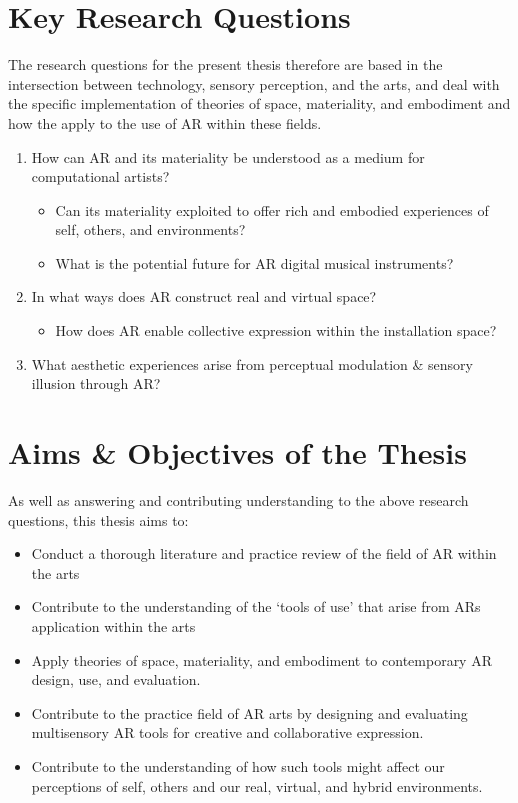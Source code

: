 \section{Key Research Questions}
The research questions for the present thesis therefore are based in the intersection between technology, sensory perception, and the arts, and deal with the specific implementation of theories of space, materiality, and embodiment and how the apply to the use of AR within these fields.

\begin{enumerate}
    \item How can AR and its materiality be understood as a medium for computational artists?
    \begin{itemize}
        \item Can its materiality exploited to offer rich and embodied experiences of self, others, and environments?
        \item What is the potential future for AR digital musical instruments?
    \end{itemize}
    \item In what ways does AR construct real and virtual space?
    \begin{itemize}
        \item How does AR enable collective expression within the installation space?
    \end{itemize}
    \item What aesthetic experiences arise from perceptual modulation \& sensory illusion through AR?
\end{enumerate}

\section{Aims \& Objectives of the Thesis}
As well as answering and contributing understanding to the above research questions, this thesis aims to:

\begin{itemize}
    \item Conduct a thorough literature and practice review of the field of AR within the arts
    \item Contribute to the understanding of the `tools of use' that arise from ARs application within the arts
    \item Apply theories of space, materiality, and embodiment to contemporary AR design, use, and evaluation.
    \item Contribute to the practice field of AR arts by designing and evaluating multisensory AR tools for creative and collaborative expression.
    \item Contribute to the understanding of how such tools might affect our perceptions of self, others and our real, virtual, and hybrid environments. 
\end{itemize}


